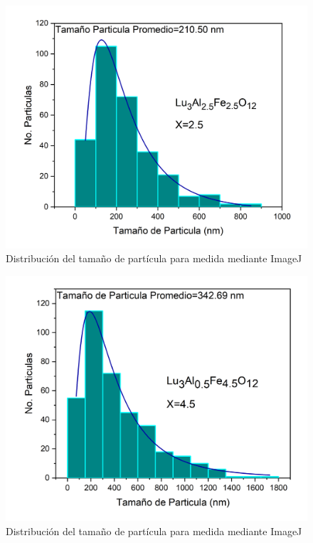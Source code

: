 \begin{appendix}
	\begin{figure}[h]
		\centering%

		\includegraphics[width=\textwidth]{Kap5/TamG5.png}%
		\caption{Distribución del tamaño de partícula para  medida mediante ImageJ}\label{fig:tamG5}
	\end{figure}

	\begin{figure}[h]
		\centering%

		\includegraphics[width=\textwidth]{Kap5/TamG9.png}%
		\caption{Distribución del tamaño de partícula para  medida mediante ImageJ}\label{fig:tamG9}
	\end{figure}


\end{appendix}

